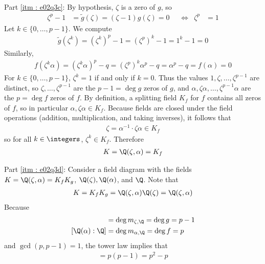 {Part \ref{itm : e02q3c}: By hypothesis, $\zeta$ is a zero of $g$, so
\begin{align*}
\zeta^{p} - 1
&=
\tilde{g}(\zeta)
=
(\zeta - 1) g(\zeta)
=
0
&
&\Leftrightarrow
&
\zeta^{p}
&=
1
\end{align*}
Let $k \in \{0, \ldots, p - 1\}$. We compute
\begin{align*}
\tilde{g}(\zeta^{k})
=
(\zeta^{k})^{p} - 1
=
(\zeta^{p})^{k} - 1
=
1^{k} - 1
=
0
\end{align*}
Similarly,
\begin{align*}
f(\zeta^{k} \alpha)
=
(\zeta^{k} \alpha)^{p} - q
=
(\zeta^{p})^{k} \alpha^{p} - q
=
\alpha^{p} - q
=
f(\alpha)
=
0
\end{align*}
For $k \in \{0, \ldots, p - 1\}$, $\zeta^{k} = 1$ if and only if $k = 0$.%
 Thus the values $1, \zeta, \ldots, \zeta^{p - 1}$ are distinct, so $\zeta, \ldots, \zeta^{p - 1}$ are the $p - 1 = \deg g$ zeros of $g$, and $\alpha, \zeta \alpha, \ldots, \zeta^{p - 1} \alpha$ are the $p = \deg f$ zeros of $f$. By definition, a splitting field $K_{f}$ for $f$ contains all zeros of $f$, so in particular $\alpha, \zeta \alpha \in K_{f}$. Because fields are closed under the field operations (addition, multiplication, and taking inverses), it follows that
\begin{align*}
\zeta
=
\alpha^{-1} \cdot \zeta \alpha
\in
K_{f}
\end{align*}
so for all $k \in \integers$, $\zeta^{k} \in K_{f}$. Therefore%
\begin{align*}
K
=
\Q(\zeta, \alpha)
=
K_{f}
\end{align*}

Part \ref{itm : e02q3d}: Consider a field diagram with the fields $K = \Q(\zeta, \alpha) = K_{f} K_{g}$, $\Q(\zeta), \Q(\alpha)$, and $\Q$. Note that
\begin{align*}
K
=
K_{f} K_{g}
=
\Q(\zeta, \alpha) \Q(\zeta)
=
\Q(\zeta, \alpha)
\end{align*}
Because
\begin{align*}
[\Q(\zeta) : \Q]
&=
\deg m_{\zeta, \Q}
=
\deg g
=
p - 1
\\
[\Q(\alpha) : \Q]
&=
\deg m_{\alpha, \Q}
=
\deg f
=
p
\end{align*}
and $\gcd(p, p - 1) = 1$, the tower law implies that
\begin{align*}
[K : \Q]
=
p (p - 1)
=
p^{2} - p
\end{align*}}%



